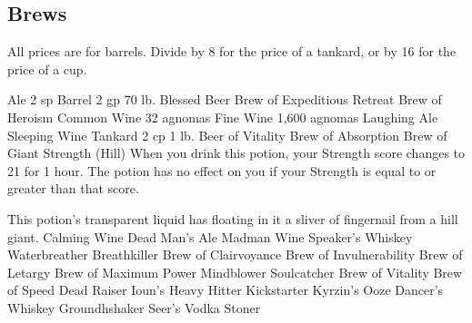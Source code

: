 \subsection*{Brews} \label{ssec::brews}
All prices are for barrels.
Divide by 8 for the price of a tankard, or by 16 for the price of a cup.


Ale 2 sp
Barrel 2 gp	70 lb.
Blessed Beer %
Brew of Expeditious Retreat %
Brew of Heroism %
Common Wine 32 agnomas
Fine Wine 1,600 agnomas
Laughing Ale %
Sleeping Wine %
Tankard 2 cp	1 lb.
Beer of Vitality %
Brew of Absorption %
Brew of Giant Strength (Hill)
    When you drink this potion, your Strength score changes to 21 for 1 hour. The potion has no effect on you if your Strength is equal to or greater than that score.

    This potion's transparent liquid has floating in it a sliver of fingernail from a hill giant.
Calming Wine %
Dead Man's Ale %
Madman Wine %
Speaker's Whiskey %
Waterbreather %
Breathkiller %
Brew of Clairvoyance
Brew of Invulnerability
Brew of Letargy %
Brew of Maximum Power
Mindblower %
Soulcatcher %
Brew of Vitality %
Brew of Speed %
Dead Raiser %
Ioun's Heavy Hitter %
Kickstarter %
Kyrzin's Ooze %
Dancer's Whiskey %
Groundhshaker %
Seer's Vodka %
Stoner %
